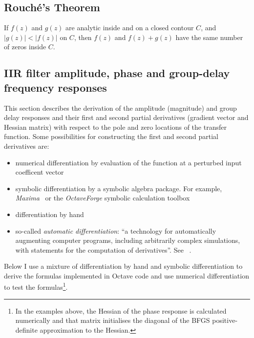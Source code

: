 \documentclass[a4paper,twoside,10pt,english]{report}
\begin{document}
\section{Rouch\'{e}'s Theorem}
If $f\left(z\right)$ and $g\left(z\right)$ are analytic inside and on a closed
contour $C$, and $\left|g\left(z\right)\right| < \left|f\left(z\right)\right|$
on $C$, then $f\left(z\right)$ and $f\left(z\right)+g\left(z\right)$ have the
same number of zeros inside $C$.
\cleardoublepage
\begin{raggedbottom}
\chapter{\label{app:IIR-filter-response}IIR filter amplitude, phase and group-delay frequency responses}
This section describes the derivation of the amplitude (magnitude) and group
delay responses and their first and second partial derivatives (gradient vector
and Hessian matrix) with respect to the pole and zero locations of the 
transfer function. Some possibilities for constructing the first and second 
partial derivatives are:
\begin{itemize}
\item numerical differentiation by evaluation of the function at a perturbed
input coefficent vector
\item symbolic differentiation by a symbolic algebra package. For example, 
\emph{Maxima}~\cite{Maxima_website} or the \emph{OctaveForge} symbolic
calculation toolbox~\cite{OctaveForge_SymbolicPackage}
\item differentiation by hand
\item so-called \emph{automatic differentiation}: ``a technology
for automatically augmenting computer programs, including arbitrarily complex
simulations, with statements for the computation of derivatives''. See 
~\cite[\emph{tools}]{Autodiff_website}.
\end{itemize}
Below I use a mixture of differentiation by hand and symbolic differentiation
to derive the formulas implemented in Octave code and use numerical 
differentiation to test the formulas\footnote{In the examples above, the Hessian
of the phase response is calculated numerically and that matrix initialises
the diagonal of the BFGS positive-definite approximation to the Hessian.}. 


\end{raggedbottom}
\end{document}
